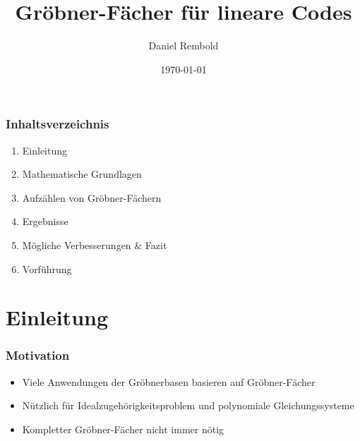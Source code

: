 \documentclass{beamer}
\title[Gröbner-Fächer für lineare Codes]{Gröbner-Fächer für lineare Codes}
\author{Daniel Rembold}
\institute[TUHH]
{
Technische Universit{\"a}t Hamburg Harburg \\
\medskip
{\emph{daniel.rembold@tuhh.de}}
}
\date{\today}
\begin{document}
%
\begin{frame}
\titlepage
\end{frame}
%

\begin{frame}
\frametitle{Inhaltsverzeichnis}

\begin{enumerate}
			\item Einleitung \\

	      	\item Mathematische Grundlagen \\
	      	
	      	\item Aufzählen von Gröbner-Fächern  \\ 
	      		
	      	\item Ergebnisse  \\ 
	  
	      	\item Mögliche Verbesserungen \& Fazit \\

		    \item Vorführung
\end{enumerate}

\end{frame}

\section{Einleitung}



\begin{frame}[<+->]
\frametitle{Motivation}

\begin{itemize}
\item
Viele Anwendungen der Gröbnerbasen basieren auf Gröbner-Fächer

\item
Nützlich für Idealzugehörigkeitsproblem und polynomiale Gleichungssysteme

\item 
Kompletter Gröbner-Fächer nicht immer nötig


\end{itemize}






\end{frame}
\end{document}
